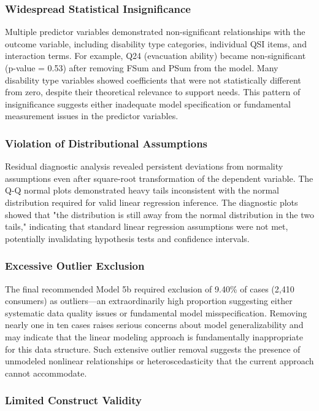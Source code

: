 \documentclass[12pt]{article}
\begin{document}
\subsubsection{Widespread Statistical Insignificance}

Multiple predictor variables demonstrated non-significant relationships with the outcome variable, including disability type categories, individual QSI items, and interaction terms. For example, Q24 (evacuation ability) became non-significant (p-value = 0.53) after removing FSum and PSum from the model. Many disability type variables showed coefficients that were not statistically different from zero, despite their theoretical relevance to support needs. This pattern of insignificance suggests either inadequate model specification or fundamental measurement issues in the predictor variables.

\subsubsection{Violation of Distributional Assumptions}

Residual diagnostic analysis revealed persistent deviations from normality assumptions even after square-root transformation of the dependent variable. The Q-Q normal plots demonstrated heavy tails inconsistent with the normal distribution required for valid linear regression inference. The diagnostic plots showed that "the distribution is still away from the normal distribution in the two tails," indicating that standard linear regression assumptions were not met, potentially invalidating hypothesis tests and confidence intervals.

\subsubsection{Excessive Outlier Exclusion}

The final recommended Model 5b required exclusion of 9.40\% of cases (2,410 consumers) as outliers—an extraordinarily high proportion suggesting either systematic data quality issues or fundamental model misspecification. Removing nearly one in ten cases raises serious concerns about model generalizability and may indicate that the linear modeling approach is fundamentally inappropriate for this data structure. Such extensive outlier removal suggests the presence of unmodeled nonlinear relationships or heteroscedasticity that the current approach cannot accommodate.

\subsubsection{Limited Construct Validity}
\end{document}
